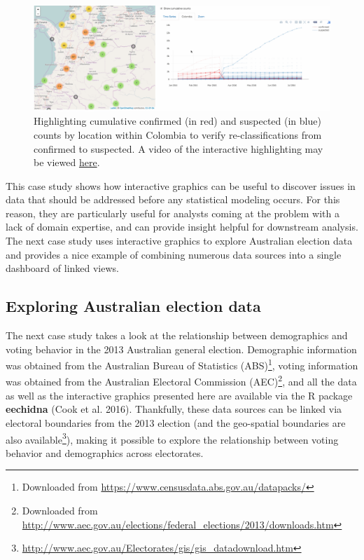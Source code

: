 \documentclass[12pt,]{article}
\let\rmarkdownfootnote\footnote%
\def\footnote{\protect\rmarkdownfootnote}
\theoremstyle{definition}
\theoremstyle{definition}
\theoremstyle{remark}
\begin{document}
\begin{figure}
\centering
\includegraphics{images/zikar-colombia.pdf}
\caption{\label{fig:zikar-colombia}Highlighting cumulative confirmed (in
red) and suspected (in blue) counts by location within Colombia to
verify re-classifications from confirmed to suspected. A video of the
interactive highlighting may be viewed
\href{https://vimeo.com/190736801}{here}.}
\end{figure}

This case study shows how interactive graphics can be useful to discover
issues in data that should be addressed before any statistical modeling
occurs. For this reason, they are particularly useful for analysts
coming at the problem with a lack of domain expertise, and can provide
insight helpful for downstream analysis. The next case study uses
interactive graphics to explore Australian election data and provides a
nice example of combining numerous data sources into a single dashboard
of linked views.

\hypertarget{exploring-australian-election-data}{\subsection{Exploring
Australian election data}\label{exploring-australian-election-data}}

The next case study takes a look at the relationship between
demographics and voting behavior in the 2013 Australian general
election. Demographic information was obtained from the Australian
Bureau of Statistics (ABS)\footnote{Downloaded from
  \url{https://www.censusdata.abs.gov.au/datapacks/}}, voting
information was obtained from the Australian Electoral Commission
(AEC)\footnote{Downloaded from
  \url{http://www.aec.gov.au/elections/federal_elections/2013/downloads.htm}},
and all the data as well as the interactive graphics presented here are
available via the R package \textbf{eechidna} (Cook et al. 2016).
Thankfully, these data sources can be linked via electoral boundaries
from the 2013 election (and the geo-spatial boundaries are also
available\footnote{\url{http://www.aec.gov.au/Electorates/gis/gis_datadownload.htm}}),
making it possible to explore the relationship between voting behavior
and demographics across electorates.
\end{document}
